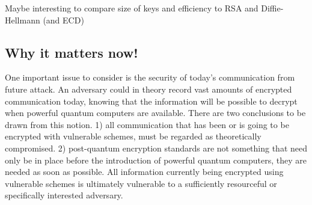 \documentclass[conference]{IEEEtran}
\begin{document}
Maybe interesting to compare size of keys and efficiency to RSA and Diffie-Hellmann (and ECD)

\subsection{Why it matters now!}
One important issue to consider is the security of today's communication from future attack.
An adversary could in theory record vast amounts of encrypted communication today, knowing that the information will be possible to decrypt when powerful quantum computers are available.
There are two conclusions to be drawn from this notion.
1) all communication that has been or is going to be encrypted with vulnerable schemes, must be regarded as theoretically compromised.
2) post-quantum encryption standards are not something that need only be in place before the introduction of powerful quantum computers, they are needed as soon as possible.
All information currently being encrypted using vulnerable schemes is ultimately vulnerable to a sufficiently resourceful or specifically interested adversary.




\end{document}
